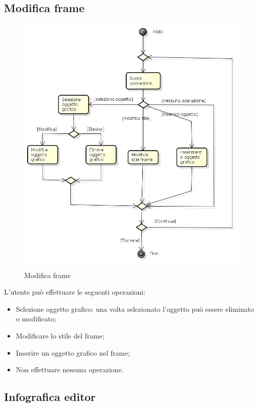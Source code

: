 \newpage

\subsection{Modifica frame}

\begin{figure}[h!]
		\centering
		\includegraphics[scale=.5]{img/Modifica_frame.jpg}
		\caption{Modifica frame}
		\label{fig:Modifica_frame}
\end{figure}

L'utente può effettuare le seguenti operazioni:
\begin{itemize}
\item Selezione oggetto grafico: una volta selezionato l'oggetto può essere eliminato o modificato;
\item Modificare lo stile del frame;
\item Inserire un oggetto grafico nel frame;
\item Non effettuare nessuna operazione.
\end{itemize}

\newpage

\subsection{Infografica editor}

